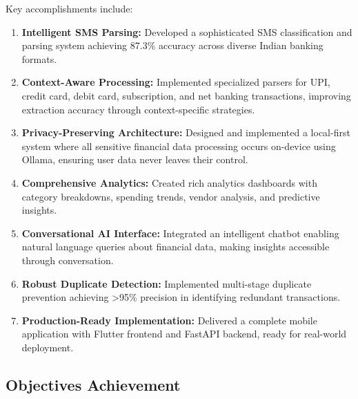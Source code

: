 \documentclass[11pt,a4paper]{report}
\begin{document}
\begin{itemize}
\begin{itemize}
Key accomplishments include:

\begin{enumerate}
    \item \textbf{Intelligent SMS Parsing:} Developed a sophisticated SMS classification and parsing system achieving 87.3\% accuracy across diverse Indian banking formats.
    
    \item \textbf{Context-Aware Processing:} Implemented specialized parsers for UPI, credit card, debit card, subscription, and net banking transactions, improving extraction accuracy through context-specific strategies.
    
    \item \textbf{Privacy-Preserving Architecture:} Designed and implemented a local-first system where all sensitive financial data processing occurs on-device using Ollama, ensuring user data never leaves their control.
    
    \item \textbf{Comprehensive Analytics:} Created rich analytics dashboards with category breakdowns, spending trends, vendor analysis, and predictive insights.
    
    \item \textbf{Conversational AI Interface:} Integrated an intelligent chatbot enabling natural language queries about financial data, making insights accessible through conversation.
    
    \item \textbf{Robust Duplicate Detection:} Implemented multi-stage duplicate prevention achieving >95\% precision in identifying redundant transactions.
    
    \item \textbf{Production-Ready Implementation:} Delivered a complete mobile application with Flutter frontend and FastAPI backend, ready for real-world deployment.
\end{enumerate}

\subsection{Objectives Achievement}


\end{itemize}
\end{itemize}
\end{document}
